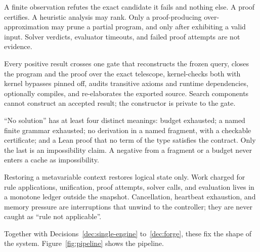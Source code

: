 \begin{decision}\label{dec:graded}
A finite observation refutes the exact candidate it fails and nothing else. A proof certifies. A heuristic analysis may rank. Only a proof-producing over-approximation may prune a partial program, and only after exhibiting a valid input. Solver verdicts, evaluator timeouts, and failed proof attempts are not evidence.
\end{decision}

\begin{decision}\label{dec:gate}
Every positive result crosses one gate that reconstructs the frozen query, closes the program and the proof over the exact telescope, kernel-checks both with kernel bypasses pinned off, audits transitive axioms and runtime dependencies, optionally compiles, and re-elaborates the exported source. Search components cannot construct an accepted result; the constructor is private to the gate.
\end{decision}

\begin{decision}\label{dec:negatives}
``No solution'' has at least four distinct meanings: budget exhausted; a named finite grammar exhausted; no derivation in a named fragment, with a checkable certificate; and a Lean proof that no term of the type satisfies the contract. Only the last is an impossibility claim. A negative from a fragment or a budget never enters a cache as impossibility.
\end{decision}

\begin{decision}\label{dec:ledger}
Restoring a metavariable context restores logical state only. Work charged for rule applications, unification, proof attempts, solver calls, and evaluation lives in a monotone ledger outside the snapshot. Cancellation, heartbeat exhaustion, and memory pressure are interruptions that unwind to the controller; they are never caught as ``rule not applicable''.
\end{decision}

Together with Decisions~\ref{dec:single-engine} to~\ref{dec:forge}, these fix the shape of the system. Figure~\ref{fig:pipeline} shows the pipeline.


